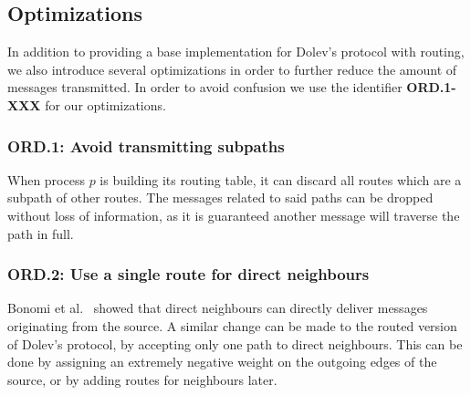 
\subsection{Optimizations}
In addition to providing a base implementation for Dolev's protocol with routing, we also introduce several optimizations in order to further reduce the amount of messages transmitted. In order to avoid confusion we use the identifier \textbf{ORD.1-XXX} for our optimizations.

\subsubsection{ORD.1: Avoid transmitting subpaths}
When process $p$ is building its routing table, it can discard all routes which are a subpath of other routes. The messages related to said paths can be dropped without loss of information, as it is guaranteed another message will traverse the path in full.

\subsubsection{ORD.2: Use a single route for direct neighbours}
Bonomi et al.~\cite{bonomi2019multihop} showed that direct neighbours can directly deliver messages originating from the source. A similar change can be made to the routed version of Dolev's protocol, by accepting only one path to direct neighbours. This can be done by assigning an extremely negative weight on the outgoing edges of the source, or by adding routes for neighbours later.

